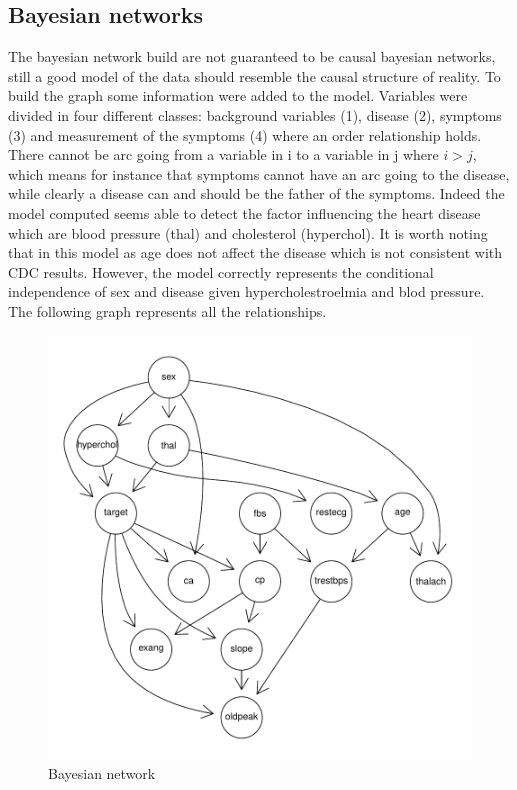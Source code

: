 \documentclass{article}
\begin{document}
\subsection{Bayesian networks}
The bayesian network build are not guaranteed to be causal bayesian networks, still a good model of the data should resemble the causal structure of reality. To build the graph some information were added to the model. Variables were divided in four different classes: background variables (1), disease (2), symptoms (3) and measurement of the symptoms (4) where an order relationship holds. There cannot be arc going from a variable in i to a variable in j where $i > j$, which means for instance that symptoms cannot have an arc going to the disease, while clearly a disease can and should be the father of the symptoms.
Indeed the model computed seems able to detect the factor influencing the heart disease which are blood pressure (thal) and cholesterol (hyperchol). It is worth noting that in this model as age does not affect the disease which is not consistent with CDC results. However, the model correctly represents the conditional independence of sex and disease given hypercholestroelmia and blod pressure.\\

The following graph represents all the relationships.
\begin{figure}[H]
       \centering
       \includegraphics[width=1\textwidth]{bn res.pdf}
       \caption{Bayesian network}
\end{figure}
\end{document}
